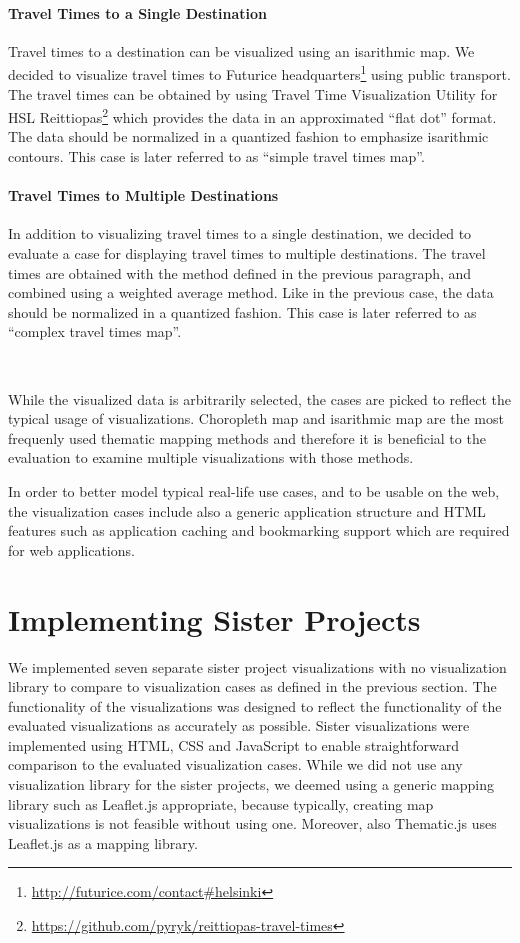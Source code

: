 \paragraph{Travel Times to a Single Destination}
Travel times to a destination can be visualized using an isarithmic map. We decided to visualize travel times to Futurice headquarters\footnote{\url{http://futurice.com/contact\#helsinki}} using public transport. The travel times can be obtained by using Travel Time Visualization Utility for HSL Reittiopas\footnote{\url{https://github.com/pyryk/reittiopas-travel-times}} which provides the data in an approximated ``flat dot'' format. The data should be normalized in a quantized fashion to emphasize isarithmic contours. This case is later referred to as ``simple travel times map''.

\paragraph{Travel Times to Multiple Destinations}
In addition to visualizing travel times to a single destination, we decided to evaluate a case for displaying travel times to multiple destinations. The travel times are obtained with the method defined in the previous paragraph, and combined using a weighted average method. Like in the previous case, the data should be normalized in a quantized fashion. This case is later referred to as ``complex travel times map''.

~

While the visualized data is arbitrarily selected, the cases are picked to reflect the typical usage of visualizations. Choropleth map and isarithmic map are the most frequenly used thematic mapping methods \citep[chap.~14-15]{slocum_thematic_2014} and therefore it is beneficial to the evaluation to examine multiple visualizations with those methods.

In order to better model typical real-life use cases, and to be usable on the web, the visualization cases include also a generic application structure and HTML features such as application caching and bookmarking support which are required for web applications.

\section{Implementing Sister Projects}

We implemented seven separate sister project visualizations with no visualization library to compare to visualization cases as defined in the previous section. The functionality of the visualizations was designed to reflect the functionality of the evaluated visualizations as accurately as possible. Sister visualizations were implemented using HTML, CSS and JavaScript to enable straightforward comparison to the evaluated visualization cases. While we did not use any visualization library for the sister projects, we deemed using a generic mapping library such as Leaflet.js appropriate, because typically, creating map visualizations is not feasible without using one. Moreover, also Thematic.js uses Leaflet.js as a mapping library.

